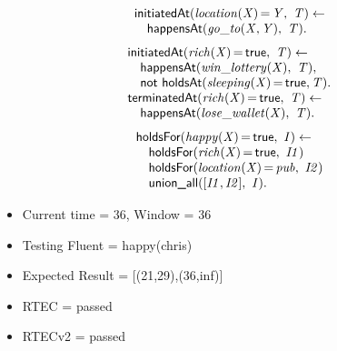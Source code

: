 \documentclass[8pt]{beamer}
\DeclareMathOperator{\val}{=}  %
\def \patsize {}
\def\happensAt{\textsf{\patsize happensAt}}
\def\holdsAt{\textsf{\patsize holdsAt}}
\def\holdsFor{\textsf{\patsize holdsFor}}
\def\initiatedAt{\textsf{\patsize initiatedAt}}
\def\terminatedAt{\textsf{\patsize terminatedAt}}
\def\unionall{\textsf{\patsize union\_all}}
\def\nbf{\textsf{\patsize not}}
\def\true{\textsf{\patsize true}}
\newenvironment{mysplit}%
  {\arraycolsep 0pt \begin{array}{l}}%
  {\end{array}}
\begin{document}
\begin{frame}
\begin{minipage}{0.48\linewidth}
        \begin{align*}
            \begin{mysplit}
                \initiatedAt\mathit{(location(X)\val Y,\ T) \leftarrow}\\
                \quad    \happensAt\mathit{(go\_to(X,Y),\ T).}
            \end{mysplit}
        \end{align*}
        \begin{align*}
            \begin{mysplit}
                \initiatedAt\mathit{(rich(X)\val\true,\ T) \leftarrow}\\
                \quad    \happensAt\mathit{(win\_lottery(X),\ T),}\\
                \quad    \nbf\ \holdsAt\mathit{(sleeping(X)\val\true,T)}.\\
                \terminatedAt\mathit{(rich(X)\val\true,\ T) \leftarrow}\\
                \quad    \happensAt\mathit{(lose\_wallet(X),\ T)}.\\
            \end{mysplit}
        \end{align*}
        \begin{align*}
            \begin{mysplit}
                \holdsFor\mathit{(happy(X)\val\true,\ I) \leftarrow}\\
                \quad    \holdsFor\mathit{(rich(X)\val\true,\ I1)}\\
                \quad    \holdsFor\mathit{(location(X)\val pub,\ I2)}\\
                \quad    \unionall\mathit{([I1,I2],\ I)}.
            \end{mysplit}
        \end{align*}
    \end{minipage}


    \begin{itemize}
        \item Current time = 36, Window = 36
        \item Testing Fluent = happy(chris)
        \item Expected Result = [(21,29),(36,inf)]
        \item RTEC = passed
        \item RTECv2 = passed
    \end{itemize}
\end{frame}
\end{document}
